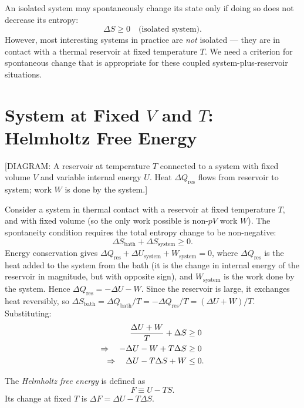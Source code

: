 An isolated system may spontaneously change its state only if doing so does not decrease its entropy:
\begin{equation}
    \Delta S \geq 0 \quad \text{(isolated system)}.
\end{equation}
However, most interesting systems in practice are \emph{not} isolated — they are in contact with a thermal reservoir at fixed temperature $T$. We need a criterion for spontaneous change that is appropriate for these coupled system-plus-reservoir situations.

\section{System at Fixed \texorpdfstring{$V$}{V} and \texorpdfstring{$T$}{T}: Helmholtz Free Energy}

\begin{center}[DIAGRAM: A reservoir at temperature $T$ connected to a system with fixed volume $V$ and variable internal energy $U$. Heat $\Delta Q_{\text{res}}$ flows from reservoir to system; work $W$ is done by the system.]\end{center}

Consider a system in thermal contact with a reservoir at fixed temperature $T$, and with fixed volume (so the only work possible is non-$pV$ work $W$). The spontaneity condition requires the total entropy change to be non-negative:
\begin{equation}
    \Delta S_{\text{bath}} + \Delta S_{\text{system}} \geq 0.
\end{equation}
Energy conservation gives $\Delta Q_{\text{res}} + \Delta U_{\text{system}} + W_{\text{system}} = 0$, where $\Delta Q_{\text{res}}$ is the heat added to the system from the bath (it is the change in internal energy of the reservoir in magnitude, but with opposite sign), and $W_{\text{system}}$ is the work done by the system. Hence $\Delta Q_{\text{res}} = -\Delta U - W$. Since the reservoir is large, it exchanges heat reversibly, so $\Delta S_{\text{bath}} = \Delta Q_{\text{bath}}/T = -\Delta Q_{\text{res}}/T = (\Delta U + W)/T$. Substituting:
\begin{align}
    \frac{\Delta U + W}{T} + \Delta S &\geq 0 \notag \\
    \Rightarrow\quad -\Delta U - W + T\Delta S &\geq 0 \notag \\
    \Rightarrow\quad \Delta U - T\Delta S + W &\leq 0.
\end{align}

\begin{definition}
The \emph{Helmholtz free energy} is defined as
\begin{equation}
    F \equiv U - TS.
\end{equation}
Its change at fixed $T$ is $\Delta F = \Delta U - T\Delta S$.
\end{definition}


